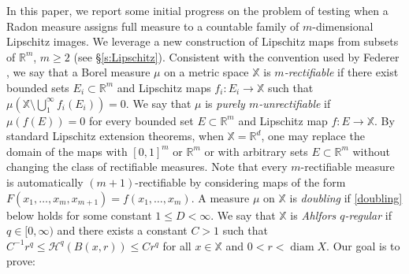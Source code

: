 \documentclass[12pt]{amsart}
\theoremstyle{definition}
\theoremstyle{remark}
\newcommand{\RR}{\mathbb{R}}
\newcommand{\XX}{\mathbb{X}}
\newcommand{\Haus}{\mathcal{H}}
\newcommand{\diam}{\mathop\mathrm{diam}\nolimits}
\numberwithin{figure}{section}
\numberwithin{equation}{section}
\begin{document}
In this paper, we report some initial progress on the problem of testing when a Radon measure assigns full measure to a countable family of $m$-dimensional Lipschitz images. We leverage a new construction of Lipschitz maps from subsets of $\RR^m$, $m\geq 2$ (see \S\ref{s:Lipschitz}). Consistent with the convention used by Federer \cite[\S3.2.14]{Federer}, we say that a Borel measure $\mu$ on a metric space $\XX$ is \emph{$m$-rectifiable} if there exist bounded sets $E_i\subset\RR^m$ and Lipschitz maps $f_i:E_i\rightarrow\XX$ such that $\mu(\XX\setminus\bigcup_1^\infty f_i(E_i))=0$. We say that $\mu$ is \emph{purely $m$-unrectifiable} if $\mu(f(E))=0$ for every bounded set $E\subset\RR^m$ and Lipschitz map $f:E\rightarrow\XX$. By standard Lipschitz extension theorems, when $\XX=\RR^d$, one may replace the domain of the maps with $[0,1]^m$ or $\RR^m$ or with arbitrary sets $E\subset\RR^m$ without changing the class of rectifiable measures. Note that every $m$-rectifiable measure is automatically $(m+1)$-rectifiable by considering maps of the form $F(x_1,\dots,x_m,x_{m+1})=f(x_1,\dots,x_m)$. A measure $\mu$ on $\XX$ is \emph{doubling} if \eqref{doubling} below holds for some constant $1\leq D<\infty$. We say that $\XX$ is \emph{Ahlfors $q$-regular} if $q\in[0,\infty)$ and there exists a constant $C>1$ such that $C^{-1}r^q\leq \Haus^q(B(x,r))\leq C r^q$ for all $x\in\XX$ and $0<r<\diam X$. Our goal is to prove:
\end{document}
